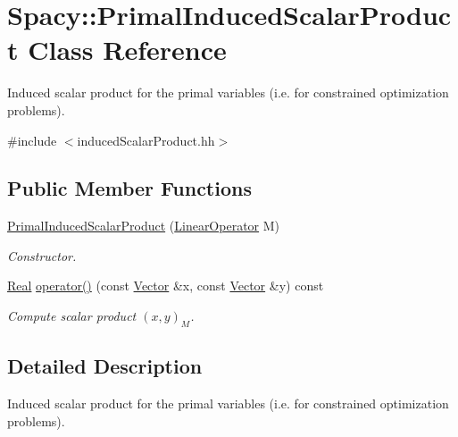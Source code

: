 \hypertarget{classSpacy_1_1PrimalInducedScalarProduct}{\section{Spacy\-:\-:Primal\-Induced\-Scalar\-Product Class Reference}
\label{classSpacy_1_1PrimalInducedScalarProduct}
}


Induced scalar product for the primal variables (i.\-e. for constrained optimization problems).  




{\ttfamily \#include $<$induced\-Scalar\-Product.\-hh$>$}

\subsection*{Public Member Functions}
\begin{DoxyCompactItemize}
\item 
\hyperlink{classSpacy_1_1PrimalInducedScalarProduct_acfea3362a4d59ae0c689bd525870d830}{Primal\-Induced\-Scalar\-Product} (\hyperlink{classSpacy_1_1LinearOperator}{Linear\-Operator} M)
\begin{DoxyCompactList}\small\item\em Constructor. \end{DoxyCompactList}\item 
\hypertarget{classSpacy_1_1PrimalInducedScalarProduct_aee0ed0c7fe70e8630cbf77702d73c97c}{\hyperlink{classSpacy_1_1Real}{Real} \hyperlink{classSpacy_1_1PrimalInducedScalarProduct_aee0ed0c7fe70e8630cbf77702d73c97c}{operator()} (const \hyperlink{classSpacy_1_1Vector}{Vector} \&x, const \hyperlink{classSpacy_1_1Vector}{Vector} \&y) const }\label{classSpacy_1_1PrimalInducedScalarProduct_aee0ed0c7fe70e8630cbf77702d73c97c}

\begin{DoxyCompactList}\small\item\em Compute scalar product $(x,y)_M$. \end{DoxyCompactList}\end{DoxyCompactItemize}


\subsection{Detailed Description}
Induced scalar product for the primal variables (i.\-e. for constrained optimization problems). 


